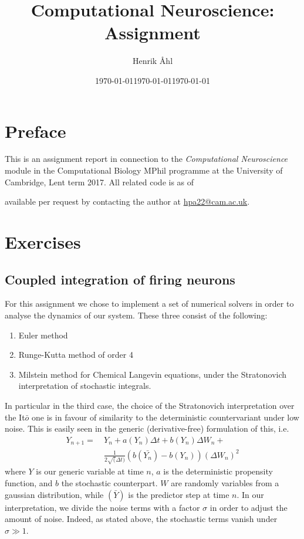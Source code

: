 \documentclass[10pt]{article}
\title
{\bf
  Computational Neuroscience: Assignment \ass
}
\author{Henrik Åhl}
\date{\today}
\theoremstyle{plain}
\begin{document}
\date{\today}
\maketitle
\setcounter{page}{1}
\begin{multicols*}{2}
\section*{Preface}
This is an assignment report in connection to the \textit{Computational
Neuroscience} module in the Computational Biology MPhil programme at the
University of Cambridge, Lent term 2017. All related code is as of
\date{\today} available per request by contacting the author at
\href{mailto:hpa22@cam.ac.uk}{hpa22@cam.ac.uk}.
\section*{Exercises}
\subsection*{Coupled integration of firing neurons}
For this assignment we chose to implement a set of numerical solvers in order
to analyse the dynamics of our system. These three consist of the following:
\begin{enumerate}
  \item Euler method
  \item Runge-Kutta method of order 4
  \item Milstein method for Chemical Langevin equations, under the Stratonovich
    interpretation of stochastic integrals.
\end{enumerate}

In particular in the third case, the choice of the Stratonovich interpretation
over the It$\bar{o}$ one is in favour of similarity to the deterministic
countervariant under low noise. This is easily seen in the generic
(derivative-free) formulation of this,
i.e.\ 
\begin{align*}
  Y_{n+1} =~&Y_{n} + a\left( Y_n \right)\Delta t + b\left( Y_{n} \right) \Delta
  W_n + \\ &\frac{1}{2\sqrt(\Delta t)} \left( b\left( \bar{Y_{n}} \right) - b\left(
Y_{n} \right) \right) \left( \Delta W_n \right)^2 
    \label{eq:lang_strat}
\end{align*}
where $Y$ is our generic variable at time $n$, $a$ is the deterministic
propensity function, and $b$ the stochastic counterpart. $W$ are randomly
variables from a gaussian distribution, while $(\bar{Y})$ is the predictor step at
time $n$. In our interpretation, we divide the
noise terms with a factor $\sigma$ in order to adjust the amount of noise. Indeed, as
stated above, the stochastic terms vanish under $\sigma \gg 1$. 


\end{multicols*}
\end{document}
